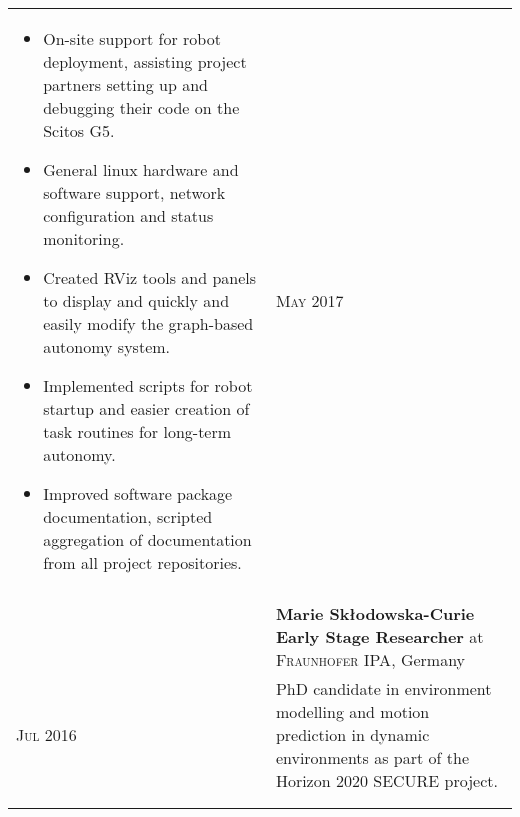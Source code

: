 \documentclass[a4paper,10pt]{article}
\newcommand{\datelen}{1.8cm}
\newcommand{\descrlen}{15.5cm}
\begin{document}
\begin{tabular}{p{\descrlen}|p{\datelen}}
{\begin{itemize}
  \item On-site support for robot deployment, assisting project partners setting up and debugging their code on the Scitos G5.
  \item General linux hardware and software support, network configuration and status monitoring.
  \item Created RViz tools and panels to display and quickly and easily modify the graph-based autonomy system.
  \item Implemented scripts for robot startup and easier creation of task routines for long-term autonomy.
  \item Improved software package documentation, scripted aggregation of documentation from all project repositories.
  \vspace{-0.5cm}
  \end{itemize}}&\textsc{May 2017}\\
  \multicolumn{2}{c}{} \\[-0.2cm]
  \begin{comment}
    General work on the STRANDS project codebase, improving the user-facing functionality. Mostly ROS development in Python and C++, along with bash scripting and some linux networking and system administration activities.

    Involved in the deployment of one of the STRANDS project robots in an office environment, where I helped monitor and diagnose issues with the robot and tried to ensure that the deployment achieved its research goals. I worked with researchers from the other universities involved in the project to help them get their parts of the system tested and working during the deployment.
  \end{comment}
  \begin{comment}
  \textsc{Mar} to& \textbf{Marie Skłodowska-Curie Early Stage Researcher} at \textsc{Fraunhofer IPA}, Germany\\
  \textsc{Jul 2016}&\footnotesize{PhD candidate in environment modelling and motion prediction in dynamic environments as part of the Horizon 2020 SECURE project.}\\\multicolumn{2}{c}{} \\[-0.2cm]
  \end{comment}
  \begin{comment}
    Working as a fellow of the SECURE project, part of the European Union’s Horizon 2020 research and innovation programme. In brief, the project aims to improve the safety of robots with a view to using them in environments which require interaction with humans. My responsibility was multimodal modelling and motion prediction in dynamic environments. 


\end{comment}
\end{tabular}
\end{document}
